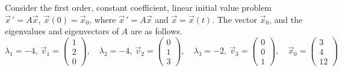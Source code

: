 \ifnum {}
\question[10] Consider the first order, constant coefficient, linear initial value problem $\vec x \, ' = A\vec x, \ \vec x (0) = \vec x_0$, where $\vec x \, ' = A\vec x$ and $\vec x = \vec x(t)$. The vector $\vec x_0$, and the eigenvalues and eigenvectors of $A$ are as follows. 
$$\lambda_1 = -4, \ \vec v_1 = \begin{pmatrix}1\\2\\0 \end{pmatrix} , \quad \lambda_2 = -4, \ \vec v_2 = \begin{pmatrix} 0\\1\\3 \end{pmatrix}, \quad \lambda_3 = -2, \ \vec v_3 = \begin{pmatrix} 0\\0\\1\end{pmatrix}, \quad \vec x_0 = \begin{pmatrix} 3\\4\\12\end{pmatrix}$$
